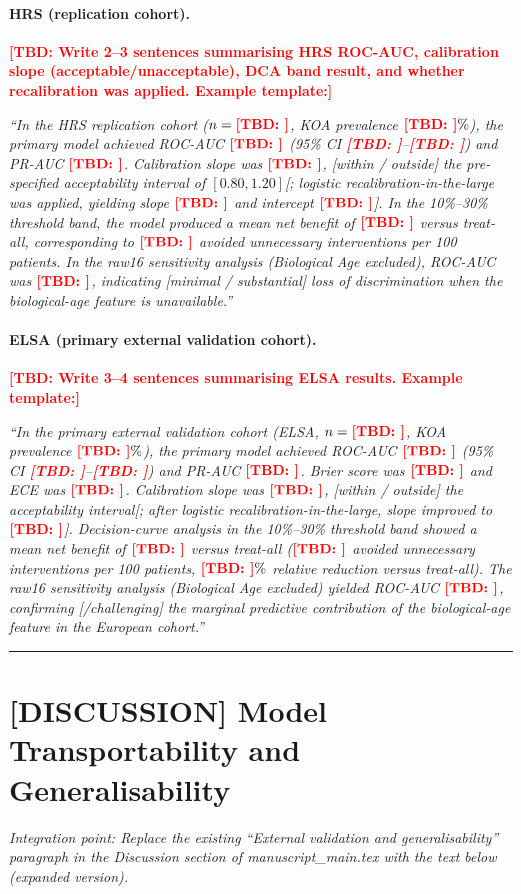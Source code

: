 \documentclass[11pt,a4paper]{article}
\newcommand{\TBD}[1]{\textcolor{red}{\textbf{[TBD: #1]}}}
\begin{document}
\paragraph{HRS (replication cohort).}
\TBD{Write 2--3 sentences summarising HRS ROC-AUC, calibration slope (acceptable/unacceptable), DCA band result, and whether recalibration was applied. Example template:}

\textit{``In the HRS replication cohort ($n=\TBD{}$, KOA prevalence $\TBD{}\%$), the primary model achieved ROC-AUC $\TBD{}$ (95\% CI \TBD{}--\TBD{}) and PR-AUC $\TBD{}$. Calibration slope was $\TBD{}$, [within / outside] the pre-specified acceptability interval of $[0.80, 1.20]$[; logistic recalibration-in-the-large was applied, yielding slope $\TBD{}$ and intercept $\TBD{}$]. In the 10\%--30\% threshold band, the model produced a mean net benefit of $\TBD{}$ versus treat-all, corresponding to $\TBD{}$ avoided unnecessary interventions per 100 patients. In the raw16 sensitivity analysis (Biological Age excluded), ROC-AUC was $\TBD{}$, indicating [minimal / substantial] loss of discrimination when the biological-age feature is unavailable.''}

\paragraph{ELSA (primary external validation cohort).}
\TBD{Write 3--4 sentences summarising ELSA results. Example template:}

\textit{``In the primary external validation cohort (ELSA, $n=\TBD{}$, KOA prevalence $\TBD{}\%$), the primary model achieved ROC-AUC $\TBD{}$ (95\% CI \TBD{}--\TBD{}) and PR-AUC $\TBD{}$. Brier score was $\TBD{}$ and ECE was $\TBD{}$. Calibration slope was $\TBD{}$, [within / outside] the acceptability interval[; after logistic recalibration-in-the-large, slope improved to $\TBD{}$]. Decision-curve analysis in the 10\%--30\% threshold band showed a mean net benefit of $\TBD{}$ versus treat-all ($\TBD{}$ avoided unnecessary interventions per 100 patients, $\TBD{}\%$ relative reduction versus treat-all). The raw16 sensitivity analysis (Biological Age excluded) yielded ROC-AUC $\TBD{}$, confirming [/challenging] the marginal predictive contribution of the biological-age feature in the European cohort.''}

\vspace{8pt}
\hrule

\section*{[DISCUSSION] Model Transportability and Generalisability}
\noindent\textit{Integration point: Replace the existing ``External validation and generalisability'' paragraph in the Discussion section of manuscript\_main.tex with the text below (expanded version).}
\end{document}
